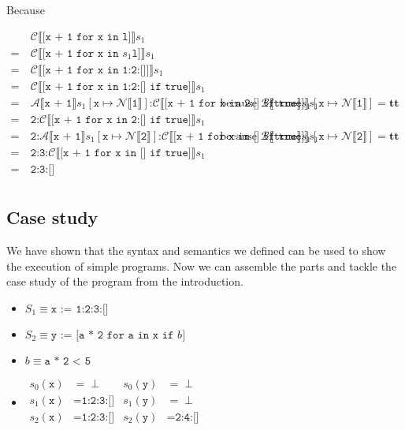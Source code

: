 \documentclass[12pt]{article}
\newcommand\mono\texttt
\newcommand{\dblbr}[1]{\llbracket#1\rrbracket}
\newcommand{\fancybr}[2]{#1 \dblbr{#2}}
\renewcommand{\AA}{\mathcal{A}}
\newcommand{\BB}{\mathcal{B}}
\newcommand{\CC}{\mathcal{C}}
\newcommand{\NN}{\mathcal{N}}
\begin{document}
Because

$\begin{aligned}
    & \fancybr{\CC}{\mono{[x + 1 for x in l]}} s_1\\
    =\ & \fancybr{\CC}{\mono{[x + 1 for x in } s_1 \mono{l]}} s_1\\
    =\ & \fancybr{\CC}{\mono{[x + 1 for x in 1:2:[]]}} s_1\\
    =\ & \fancybr{\CC}{\mono{[x + 1 for x in 1:2:[] if true]}} s_1\\
    =\ & \fancybr{\AA}{\mono{x + 1}} s_1[\mono{x} \mapsto \fancybr{\NN}{\mono{1}}] \mono{:} \fancybr{\CC}{\mono{[x + 1 for x in 2:[] if true]}} s_1
    & \text{because } \fancybr{\BB}{\mono{true}} s_1[\mono{x} \mapsto \fancybr{\NN}{\mono{1}}] = \mathbf{tt}\\
    =\ & \mono{2:} \fancybr{\CC}{\mono{[x + 1 for x in 2:[] if true]}} s_1\\
    =\ & \mono{2:} \fancybr{\AA}{\mono{x + 1}} s_1[\mono{x} \mapsto \fancybr{\NN}{\mono{2}}] \mono{:} \fancybr{\CC}{\mono{[x + 1 for x in [] if true]}} s_1
    & \text{because } \fancybr{\BB}{\mono{true}} s_1[\mono{x} \mapsto \fancybr{\NN}{\mono{2}}] = \mathbf{tt}\\
    =\ & \mono{2:3:} \fancybr{\CC}{\mono{[x + 1 for x in [] if true]}} s_1\\
    =\ & \mono{2:3:[]}\\
\end{aligned}$

\subsection{Case study}

We have shown that the syntax and semantics we defined can be used to show the execution of simple programs. Now we can assemble the parts and tackle the case study of the program from the introduction.

\begin{itemize}
    \item $S_1 \equiv \mono{x := 1:2:3:[]}$
    \item $S_2 \equiv \mono{y := [a * 2 for a in x if } b \mono{]}$
    \item $b \equiv \mono{a * 2 < 5}$
    \item $\begin{aligned}
        s_0(\mono{x}) &= \perp & s_0(\mono{y}) &= \perp\\
        s_1(\mono{x}) &= \mono{1:2:3:[]} & s_1(\mono{y}) &= \perp\\
        s_2(\mono{x}) &= \mono{1:2:3:[]} & s_2(\mono{y}) &= \mono{2:4:[]}\\
    \end{aligned}$
\end{itemize}
\end{document}
